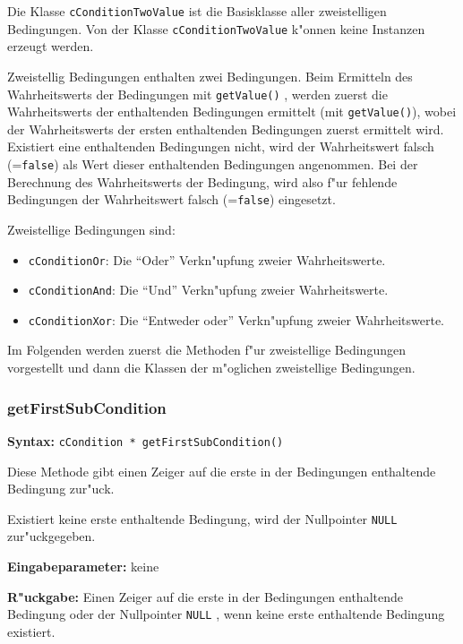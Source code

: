 Die Klasse \verb|cConditionTwoValue| ist die Basisklasse aller zweistelligen Bedingungen. Von der Klasse \verb|cConditionTwoValue| k"onnen keine Instanzen erzeugt werden.

Zweistellig Bedingungen enthalten zwei Bedingungen. Beim Ermitteln des Wahrheitswerts der Bedingungen mit \verb|getValue()| , werden zuerst die Wahrheitswerts der enthaltenden Bedingungen ermittelt (mit \verb|getValue()|), wobei der Wahrheitswerts der ersten enthaltenden Bedingungen zuerst ermittelt wird. Existiert eine enthaltenden Bedingungen nicht, wird der Wahrheitswert falsch (=\verb|false|) als Wert dieser enthaltenden Bedingungen angenommen. Bei der Berechnung des Wahrheitswerts der Bedingung, wird also f"ur fehlende Bedingungen der Wahrheitswert falsch (=\verb|false|) eingesetzt.

\bigskip\noindent
Zweistellige Bedingungen sind:
\begin{itemize}
 \item \verb|cConditionOr|: Die ``Oder'' Verkn"upfung zweier Wahrheitswerte.
 \item \verb|cConditionAnd|: Die ``Und'' Verkn"upfung zweier Wahrheitswerte.
 \item \verb|cConditionXor|: Die ``Entweder oder'' Verkn"upfung zweier Wahrheitswerte.
\end{itemize}

Im Folgenden werden zuerst die Methoden f"ur zweistellige Bedingungen vorgestellt und dann die Klassen der m"oglichen zweistellige Bedingungen.


\subsubsection{getFirstSubCondition}

\textbf{Syntax:} \verb|cCondition * getFirstSubCondition()|

\bigskip\noindent
Diese Methode gibt einen Zeiger auf die erste in der Bedingungen enthaltende Bedingung zur"uck.

Existiert keine erste enthaltende Bedingung, wird der Nullpointer \verb|NULL| zur"uckgegeben.

\bigskip\noindent
\textbf{Eingabeparameter:} keine

\bigskip\noindent
\textbf{R"uckgabe:} Einen Zeiger auf die erste in der Bedingungen enthaltende Bedingung oder der Nullpointer \verb|NULL| , wenn keine erste enthaltende Bedingung existiert.


